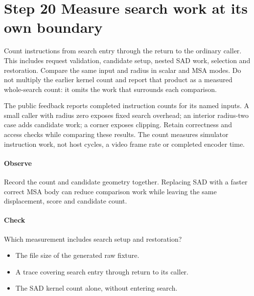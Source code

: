 \section{Step 20 Measure search work at its own boundary}\label{h263-motion-s10}
Count instructions from search entry through the return to the ordinary caller.
This includes request validation, candidate setup, nested SAD work, selection
and restoration. Compare the same input and radius in scalar and MSA modes.
Do not multiply the earlier kernel count and report that product as a measured
whole-search count: it omits the work that surrounds each comparison.

The public feedback reports completed instruction counts for its named inputs.
A small caller with radius zero exposes fixed search overhead; an interior
radius-two case adds candidate work; a corner exposes clipping. Retain correctness
and access checks while comparing these results. The count measures simulator
instruction work, not host cycles, a video frame rate or completed encoder time.

\paragraph{Observe} Record the count and candidate geometry together. Replacing
SAD with a faster correct MSA body can reduce comparison work while leaving the
same displacement, score and candidate count.
\paragraph{Check} Which measurement includes search setup and restoration?
\begin{itemize}
  \item[A.] The file size of the generated raw fixture.
  \item[B.] A trace covering search entry through return to its caller.
  \item[C.] The SAD kernel count alone, without entering search.
\end{itemize}
